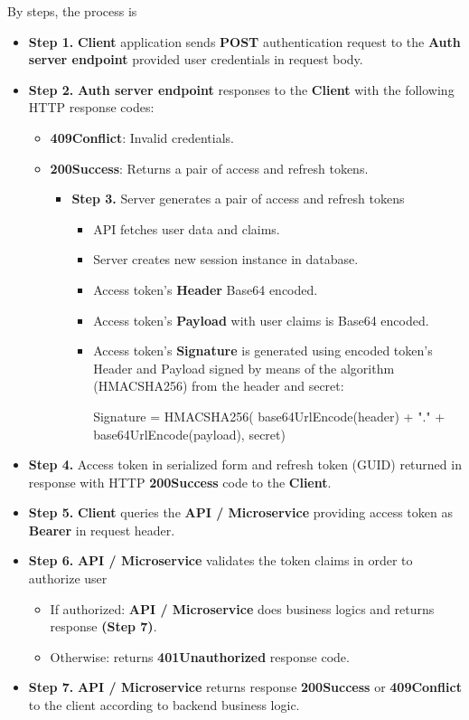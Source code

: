 By steps, the process is
\begin{itemize}
    \item \textbf{Step 1.} \textbf{Client} application sends \textbf{POST} authentication request to
    the \textbf{Auth server endpoint} provided user credentials in request body.
    \item \textbf{Step 2.} \textbf{Auth server endpoint} responses to the \textbf{Client} with the following HTTP response codes:
    \begin{itemize}
        \item \textbf{409Conflict}: Invalid credentials.
        \item \textbf{200Success}: Returns a pair of access and refresh tokens.
        \begin{itemize}
            \item \textbf{Step 3.} Server generates a pair of access and refresh tokens
            \begin{itemize}
                \item API fetches user data and claims.
                \item Server creates new session instance in database.
                \item Access token's \textbf{Header} Base64 encoded.
                \item Access token's \textbf{Payload} with user claims is Base64 encoded.
                \item Access token's \textbf{Signature} is generated using encoded token's Header and Payload signed by means of the
                algorithm (HMACSHA256) from the header and secret:
                \begin{spverbatim}
                    Signature = HMACSHA256(
                    base64UrlEncode(header) + "." +
                    base64UrlEncode(payload),
                    secret)
                \end{spverbatim}
            \end{itemize}
        \end{itemize}
    \end{itemize}
    \item \textbf{Step 4.} Access token in serialized form and refresh token (GUID) returned in response with
    HTTP \textbf{200Success} code to the \textbf{Client}.
    \item \textbf{Step 5.} \textbf{Client} queries the \textbf{API / Microservice} providing access token as
    \textbf{Bearer} in request header.
    \item \textbf{Step 6.} \textbf{API / Microservice} validates the token claims in order to authorize user
    \begin{itemize}
        \item If authorized: \textbf{API / Microservice} does business logics and returns response \textbf{(Step 7)}.
        \item Otherwise: returns \textbf{401Unauthorized} response code.
    \end{itemize}
    \item \textbf{Step 7.} \textbf{API / Microservice} returns response \textbf{200Success} or \textbf{409Conflict}
    to the client according to backend business logic.
\end{itemize}